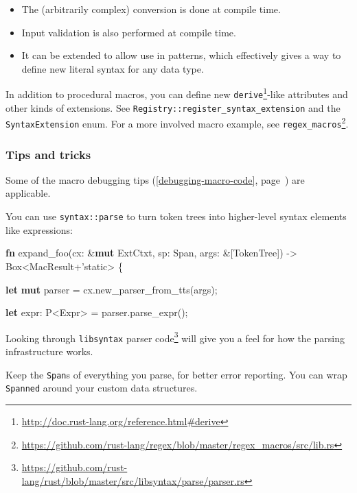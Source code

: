 \documentclass[a4paper,]{book}
\renewcommand*{\hyperlink}[2]{%
 #2 (\autoref{#1}, page~\pageref{#1})}
\newenvironment{Shaded}{\begin{snugshade}}{\end{snugshade}}
\newcommand{\KeywordTok}[1]{\textcolor[rgb]{0.13,0.29,0.53}{\textbf{{#1}}}}
\newcommand{\DataTypeTok}[1]{\textcolor[rgb]{0.13,0.29,0.53}{{#1}}}
\newcommand{\OtherTok}[1]{\textcolor[rgb]{0.56,0.35,0.01}{{#1}}}
\newcommand{\NormalTok}[1]{{#1}}
\renewcommand{\href}[2]{#2\footnote{\url{#1}}}
\providecommand{\tightlist}{%
  \setlength{\itemsep}{0pt}\setlength{\parskip}{0pt}}
\begin{document}
\begin{itemize}
\tightlist
\item
  The (arbitrarily complex) conversion is done at compile time.
\item
  Input validation is also performed at compile time.
\item
  It can be extended to allow use in patterns, which effectively gives a
  way to define new literal syntax for any data type.
\end{itemize}

In addition to procedural macros, you can define new
\href{http://doc.rust-lang.org/reference.html\#derive}{\texttt{derive}}-like
attributes and other kinds of extensions. See
\texttt{Registry::register\_syntax\_extension} and the
\texttt{SyntaxExtension} enum. For a more involved macro example, see
\href{https://github.com/rust-lang/regex/blob/master/regex_macros/src/lib.rs}{\texttt{regex\_macros}}.

\subsubsection{Tips and tricks}\label{tips-and-tricks}

Some of the \protect\hyperlink{debugging-macro-code}{macro debugging
tips} are applicable.

You can use \texttt{syntax::parse} to turn token trees into higher-level
syntax elements like expressions:

\begin{Shaded}
\begin{Highlighting}[]
\KeywordTok{fn} \NormalTok{expand_foo(cx: &}\KeywordTok{mut} \NormalTok{ExtCtxt, sp: Span, args: &[TokenTree])}
        \NormalTok{-> }\DataTypeTok{Box}\NormalTok{<MacResult+}\OtherTok{'static}\NormalTok{> \{}

    \KeywordTok{let} \KeywordTok{mut} \NormalTok{parser = cx.new_parser_from_tts(args);}

    \KeywordTok{let} \NormalTok{expr: P<Expr> = parser.parse_expr();}
\end{Highlighting}
\end{Shaded}

Looking through
\href{https://github.com/rust-lang/rust/blob/master/src/libsyntax/parse/parser.rs}{\texttt{libsyntax}
parser code} will give you a feel for how the parsing infrastructure
works.

Keep the \texttt{Span}s of everything you parse, for better error
reporting. You can wrap \texttt{Spanned} around your custom data
structures.
\end{document}

